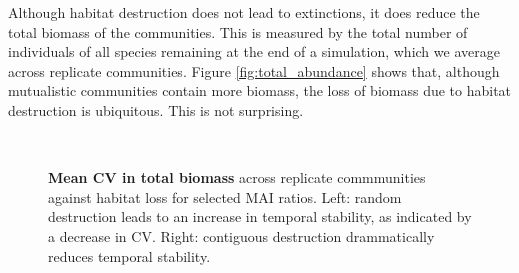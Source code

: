 Although habitat destruction does not lead to extinctions, it does reduce the total biomass of the communities. This is measured by the total number of individuals of all species remaining at the end of a simulation, which we average across replicate communities. Figure \ref{fig:total_abundance} shows that, although mutualistic communities contain more biomass, the loss of biomass due to habitat destruction is ubiquitous. This is not surprising.

\begin{figure} 
		\centering      
        ~
        \caption{\textbf{Mean CV in total biomass} across replicate commmunities against habitat loss for selected MAI ratios. Left: random destruction leads to an increase in temporal stability, as indicated by a decrease in CV. Right: contiguous destruction drammatically reduces temporal stability.}\label{fig:temporal_stability}
\end{figure}

